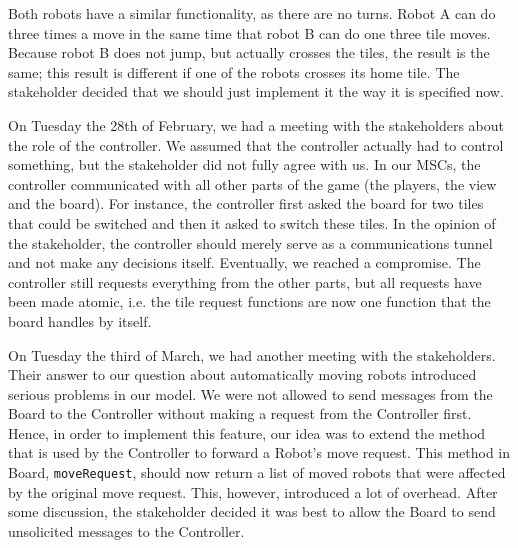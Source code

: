 \bigskip
Both robots have a similar functionality, as there are no turns. Robot A can do three times a move in the same time that robot B can do one three tile moves. Because robot B does not jump, but actually crosses the tiles, the result is the same; this result is different if one of the robots crosses its home tile. The stakeholder decided that we should just implement it the way it is specified now.

On Tuesday the 28th of February, we had a meeting with the stakeholders about the role of the controller. We assumed that the controller actually had to control something, but the stakeholder did not fully agree with us. In our MSCs, the controller communicated with all other parts of the game (the players, the view and the board). For instance, the controller first asked the board for two tiles that could be switched and then it asked to switch these tiles. In the opinion of the stakeholder, the controller should merely serve as a communications tunnel and not make any decisions itself. Eventually, we reached a compromise. The controller still requests everything from the other parts, but all requests have been made atomic, i.e. the tile request functions are now one function that the board handles by itself.

On Tuesday the third of March, we had another meeting with the stakeholders. Their answer to our question about automatically moving robots introduced serious problems in our model. We were not allowed to send messages from the Board to the Controller without making a request from the Controller first. Hence, in order to implement this feature, our idea was to extend the method that is used by the Controller to forward a Robot's move request. This method in Board, \texttt{moveRequest}, should now return a list of moved robots that were affected by the original move request. This, however, introduced a lot of overhead. After some discussion, the stakeholder decided it was best to allow the Board to send unsolicited messages to the Controller. 